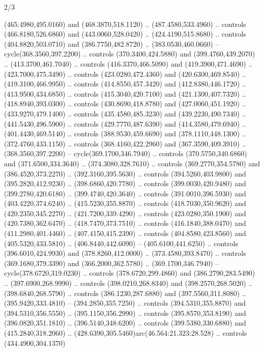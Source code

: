 \begin{flagdescription}{2/3}
\begin{scope}[xshift=0.5\flaglength,yshift=0.5\flagwidth,scale=\flagwidth/638.38]
\begin{scope}[y=0.80pt, x=0.80pt, yscale=-1,shift={(-600,-400)}]
\begin{scope}[shift={(-0.02,2.173)}]
\begin{scope}[shift={(-1.081,0)}]
  (465.4980,495.0160) and (468.3870,518.1120) .. (487.4580,533.4960) .. controls
  (466.8180,526.6860) and (443.0060,528.0420) .. (424.4190,515.8680) .. controls
  (404.8820,503.0710) and (386.7750,482.8720) .. (383.0530,460.0660) --
  cycle(368.3560,397.2200) .. controls (370.3400,424.5880) and
  (399.4760,439.2070) .. (413.3700,461.7040) .. controls (416.3370,466.5090) and
  (419.3900,471.4690) .. (423.7000,475.3490) .. controls (423.0280,472.4360) and
  (420.6300,469.8540) .. (419.3100,466.9950) .. controls (414.8550,457.3420) and
  (412.8380,446.1720) .. (413.9500,434.6850) .. controls (415.3040,420.7100) and
  (421.1300,407.7320) .. (418.8940,393.0300) .. controls (430.8690,418.8780) and
  (427.0060,451.1920) .. (433.9270,479.1400) .. controls (435.4580,485.3230) and
  (439.2230,490.7340) .. (441.5430,496.5900) .. controls (429.7770,487.6390) and
  (414.3580,479.6940) .. (401.4430,469.5140) .. controls (388.9530,459.6690) and
  (378.1110,448.1300) .. (372.4760,433.1150) .. controls (368.4160,422.2960) and
  (367.3590,409.3910) .. (368.3560,397.2200) -- cycle(369.1700,346.7940) ..
  controls (370.5750,340.6860) and (371.6500,334.3640) .. (374.3080,328.7610) ..
  controls (369.2770,354.5780) and (386.4520,373.2270) .. (392.3160,395.5630) ..
  controls (394.5260,403.9800) and (395.2820,412.9230) .. (398.6860,420.7780) ..
  controls (399.0030,420.9480) and (399.2780,420.6180) .. (399.4740,420.3640) ..
  controls (391.0010,396.5930) and (403.4220,374.6240) .. (415.5230,355.8870) ..
  controls (418.7030,350.9620) and (420.2350,345.2270) .. (421.7200,339.4290) ..
  controls (423.0280,350.1900) and (420.7380,362.6470) .. (418.7470,373.7510) ..
  controls (416.1840,388.0470) and (411.2980,401.4460) .. (407.4150,415.2390) ..
  controls (404.8580,423.8560) and (405.5320,433.5810) .. (406.8440,442.6090) --
  (405.6100,441.6250) .. controls (396.6010,424.9930) and (378.8260,412.0000) ..
  (373.4580,393.8470) .. controls (369.1680,379.3390) and (366.2000,362.5780) ..
  (369.1700,346.7940) -- cycle(378.6720,319.0230) .. controls
  (378.6720,299.4860) and (386.2790,283.5490) .. (397.6900,268.9990) .. controls
  (398.0210,268.8340) and (398.2570,268.5020) .. (398.6840,268.5790) .. controls
  (386.1230,287.6880) and (397.5560,311.8080) .. (395.9420,333.4810) --
  (394.2850,355.7250) .. controls (394.5310,355.8870) and (394.5310,356.5550) ..
  (395.1150,356.2990) .. controls (395.8570,353.8190) and (396.0820,351.1810) ..
  (396.5140,348.6200) .. controls (399.5380,330.6880) and (415.2840,318.2060) ..
  (428.6390,305.5460)arc(46.564:21.323:28.528) .. controls (434.4900,304.1370)

\end{scope}
\end{scope}
\end{scope}
\end{scope}
\end{flagdescription}
